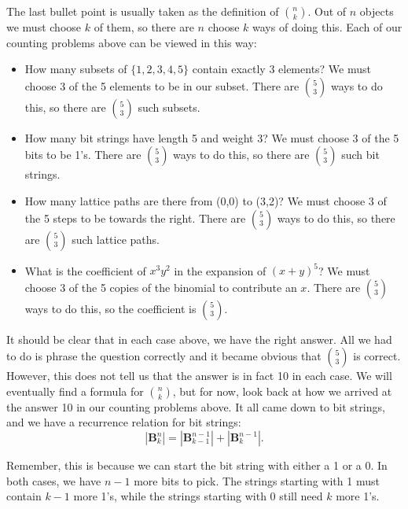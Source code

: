 \documentclass[10pt,]{book}
\theoremstyle{plain}
\theoremstyle{definition}
\theoremstyle{definition}
\theoremstyle{definition}
\numberwithin{equation}{section}
\def\B{\mathbf{B}}
\begin{document}
        The last bullet point is usually taken as the definition of \({n \choose k}\). Out of \(n\) objects we must choose \(k\) of them, so there are \(n\) choose \(k\) ways of doing this. Each of our counting problems above can be viewed in this way:
\leavevmode%
\begin{itemize}[label=\textbullet]
\item{}
How many subsets of \(\{1,2,3,4,5\}\) contain exactly 3 elements?  We must choose \(3\) of the 5 elements to be in our subset.  There are \({5 \choose 3}\) ways to do this, so there are \({5 \choose 3}\) such subsets.
%
\item{}
How many bit strings have length 5 and weight 3?  We must choose \(3\) of the 5 bits to be 1's.  There are \({5 \choose 3}\) ways to do this, so there are \({5 \choose 3}\) such bit strings.
%
\item{}
How many lattice paths are there from (0,0) to (3,2)?  We must choose 3 of the 5 steps to be towards the right.  There are \({5 \choose 3}\) ways to do this, so there are \({5 \choose 3}\) such lattice paths.
%
\item{}
What is the coefficient of \(x^3y^2\) in the expansion of \((x+y)^5\)?  We must choose 3 of the 5 copies of the binomial to contribute an \(x\).  There are \({5 \choose 3}\) ways to do this, so the coefficient is \({5 \choose 3}\).
%
\end{itemize}
\par

        It should be clear that in each case above, we have the right answer. All we had to do is phrase the question correctly and it became obvious that \({5 \choose 3}\) is correct. However, this does not tell us that the answer is in fact 10 in each case. We will eventually find a formula for \({n \choose k}\), but for now, look back at how we arrived at the answer 10 in our counting problems above. It all came down to bit strings, and we have a recurrence relation for bit strings:
        \begin{equation*}
          |\B^n_k| = |\B^{n-1}_{k-1}| + |\B^{n-1}_k|.
        \end{equation*}
\par

        Remember, this is because we can start the bit string with either a 1 or a 0. In both cases, we have \(n-1\) more bits to pick. The strings starting with 1 must contain \(k-1\) more 1's, while the strings starting with 0 still need \(k\) more 1's.
\par
\end{document}
